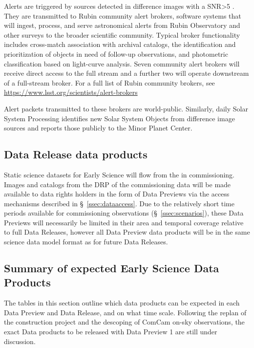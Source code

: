 Alerts are triggered by sources detected in difference images with a SNR>5 . 
They are transmitted to Rubin community alert brokers, software systems that will ingest, process, and serve astronomical alerts from Rubin Observatory and other surveys to the broader scientific community. 
Typical broker functionality includes cross-match association with archival catalogs, the identification and prioritization of objects in need of follow-up observations, and photometric classification based on light-curve analysis.
Seven community alert brokers will receive direct access to the full stream and a further two will operate downstream of a full-stream broker. 
For a full list of Rubin community brokers, see \url{https://www.lsst.org/scientists/alert-brokers}

Alert packets transmitted to these brokers are world-public.
Similarly, daily Solar System Processing identifies new Solar System Objects from difference image sources and reports those publicly to the Minor Planet Center.

\subsection{Data Release data products}
Static science datasets for Early Science will flow from the \svs in commissioning.
Images and catalogs from the DRP of the commissioning data will be made available to data rights holders in the form of Data Previews via the access mechanisms described in \S~\ref{ssec:dataaccess}.
Due to the relatively short time periods available for commissioning observations (\S~\ref{ssec:scenarios}), these Data Previews will necessarily be limited in their area and temporal coverage relative to full Data Releases, however all Data Preview data products will be in the same science data model format as for future Data Releases.


\subsection{Summary of expected Early Science Data Products} \label{ssec:dataproductsummary}
The tables in this section outline which data products can be expected in each Data Preview and Data Release, and on what time scale. 
Following the replan of the construction project and the descoping of ComCam on-sky observations, the exact Data products to be released with Data Preview 1 are still under discussion. 


